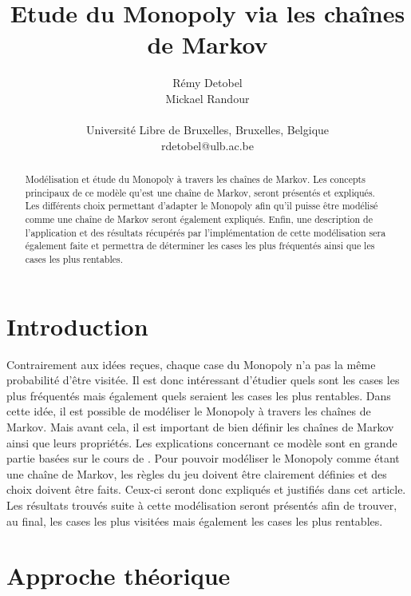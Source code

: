 \documentclass[letterpaper]{article}
\title{Etude du Monopoly via les chaînes de Markov}
\author{Rémy Detobel\\
Mickael Randour\\
\mbox{}\\
Université Libre de Bruxelles, Bruxelles, Belgique \\
rdetobel@ulb.ac.be}
\begin{document}
\maketitle

\begin{abstract}
  Modélisation et étude du Monopoly à travers les chaînes de Markov.
  Les concepts principaux de ce modèle qu'est une chaîne de Markov,
  seront présentés et expliqués.  Les différents choix permettant 
  d'adapter le Monopoly afin qu'il puisse être modélisé comme une chaîne 
  de Markov seront également expliqués.  Enfin, une description de 
  l'application et des résultats récupérés par l'implémentation de cette 
  modélisation sera également faite et permettra de déterminer les cases 
  les plus fréquentés ainsi que les cases les plus rentables.
\end{abstract}

\section{Introduction}
  Contrairement aux idées reçues, chaque case du Monopoly n'a pas la même
  probabilité d'être visitée.  Il est donc intéressant d'étudier quels sont
  les cases les plus fréquentés mais également quels seraient les cases
  les plus rentables.  Dans cette idée, il est possible de modéliser
  le Monopoly à travers les chaînes de Markov.  Mais avant cela, il est 
  important de bien définir les chaînes de Markov ainsi que leurs propriétés.
  Les explications concernant ce modèle sont en grande partie basées 
  sur le cours de \citet{COURS}.
  Pour pouvoir modéliser le Monopoly comme étant une chaîne de Markov, 
  les règles du jeu doivent être clairement définies et des choix doivent
  être faits.  Ceux-ci seront donc expliqués et justifiés dans cet article.
  Les résultats trouvés suite à cette modélisation seront présentés afin
  de trouver, au final, les cases les plus visitées mais également les cases
  les plus rentables.
  
  
\section{Approche théorique}
  
\end{document}
